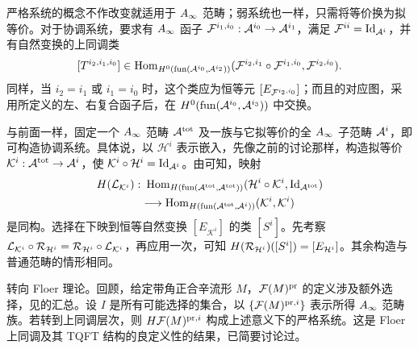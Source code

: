 严格系统的概念不作改变就适用于 $A_\infty$ 范畴；弱系统也一样，只需将等价换为拟等价。对于协调系统，要求有 $A_\infty$ 函子 $\mathcal F^{i_1,i_0}:\mathcal A^{i_0}\to\mathcal A^{i_1}$，满足 $\mathcal F^{ii}=\operatorname{Id}_{\mathcal A^i}$，并有自然变换的上同调类
\[
[T^{i_2,i_1,i_0}]\in\operatorname{Hom}_{H^0(\operatorname{fun}(\mathcal A^{i_0},\mathcal A^{i_2}))}
(\mathcal F^{i_2,i_1}\circ\mathcal F^{i_1,i_0},\mathcal F^{i_2,i_0}).
\]
同样，当 $i_2=i_1$ 或 $i_1=i_0$ 时，这个类应为恒等元 $[E_{\mathcal F^{i_2,i_0}}]$；而且的对应图，采用所定义的左、右复合函子后，在 $H^0(\operatorname{fun}(\mathcal A^{i_0},\mathcal A^{i_3}))$ 中交换。

与前面一样，固定一个 $A_\infty$ 范畴 $\mathcal A^{\mathrm{tot}}$ 及一族与它拟等价的全 $A_\infty$ 子范畴 $\mathcal A^i$，即可构造协调系统。具体说，以 $\mathcal H^i$ 表示嵌入，先像之前的讨论那样，构造拟等价 $\mathcal K^i:\mathcal A^{\mathrm{tot}}\to\mathcal A^i$，使 $\mathcal K^i\circ\mathcal H^i=\operatorname{Id}_{\mathcal A^i}$。由可知，映射
\begin{equation}\label{eq:10.2}
\begin{aligned}
H(\LG_{\mathcal K^i}):&\ \Hom_{H(\operatorname{fun}(\A^{\mathrm{tot}},\A^{\mathrm{tot}}))}
(\mathcal H^i\circ\mathcal K^i,\Id_{\A^{\mathrm{tot}}})\\
&\longrightarrow\Hom_{H(\operatorname{fun}(\A^{\mathrm{tot}},\A^i))}(\mathcal K^i,\mathcal K^i)
\end{aligned}
\end{equation}
是同构。选择在下映到恒等自然变换 $[E_{\mathcal K^i}]$ 的类 $[S^i]$。先考察 $\mathcal L_{\mathcal K^i}\circ\mathcal R_{\mathcal H^i}=\mathcal R_{\mathcal H^i}\circ\mathcal L_{\mathcal K^i}$，再应用一次，可知 $H(\mathcal R_{\mathcal H^i})([S^i])=[E_{\mathcal H^i}]$。其余构造与普通范畴的情形相同。

转向 Floer 理论。回顾，给定带角正合辛流形 $M$，$\mathcal F(M)^{\mathrm{pr}}$ 的定义涉及额外选择，见的汇总。设 $I$ 是所有可能选择的集合，以 $\{\mathcal F(M)^{\mathrm{pr},i}\}$ 表示所得 $A_\infty$ 范畴族。若转到上同调层次，则 $H\mathcal F(M)^{\mathrm{pr},i}$ 构成上述意义下的严格系统。这是 Floer 上同调及其 TQFT 结构的良定义性的结果，已简要讨论过。

